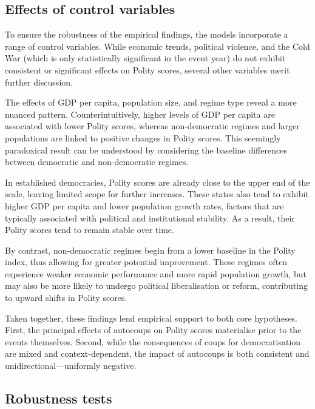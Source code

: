 \documentclass[
  12pt,
]{report}
\begin{document}
\subsection*{Effects of control
variables}\label{effects-of-control-variables}

To ensure the robustness of the empirical findings, the models
incorporate a range of control variables. While economic trends,
political violence, and the Cold War (which is only statistically
significant in the event year) do not exhibit consistent or significant
effects on Polity scores, several other variables merit further
discussion.

The effects of GDP per capita, population size, and regime type reveal a
more nuanced pattern. Counterintuitively, higher levels of GDP per
capita are associated with lower Polity scores, whereas non-democratic
regimes and larger populations are linked to positive changes in Polity
scores. This seemingly paradoxical result can be understood by
considering the baseline differences between democratic and
non-democratic regimes.

In established democracies, Polity scores are already close to the upper
end of the scale, leaving limited scope for further increases. These
states also tend to exhibit higher GDP per capita and lower population
growth rates, factors that are typically associated with political and
institutional stability. As a result, their Polity scores tend to remain
stable over time.

By contrast, non-democratic regimes begin from a lower baseline in the
Polity index, thus allowing for greater potential improvement. These
regimes often experience weaker economic performance and more rapid
population growth, but may also be more likely to undergo political
liberalisation or reform, contributing to upward shifts in Polity
scores.

Taken together, these findings lend empirical support to both core
hypotheses. First, the principal effects of autocoups on Polity scores
materialise prior to the events themselves. Second, while the
consequences of coups for democratisation are mixed and
context-dependent, the impact of autocoups is both consistent and
unidirectional---uniformly negative.

\subsection*{Robustness tests}\label{robustness-tests}
\end{document}
